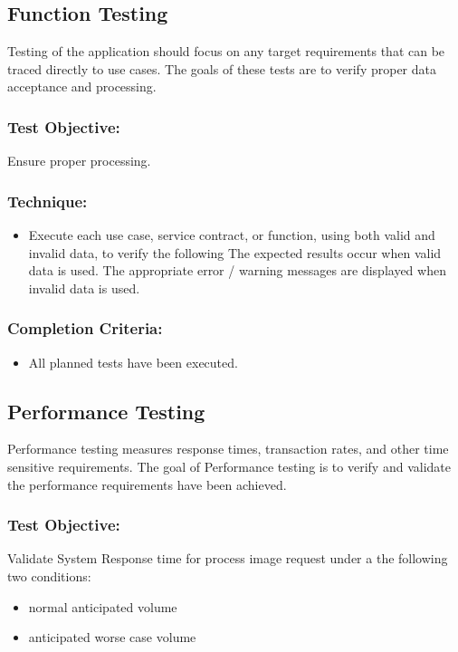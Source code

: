 \documentclass[a4paper,12pt]{report}
\begin{document}
		\subsection {Function Testing}
			Testing of the application should focus on any target requirements that can be traced directly to use cases. 
			The goals of these tests are to verify proper data acceptance and processing.
			\subsubsection {Test Objective:}
				Ensure proper processing.
			\subsubsection {Technique:}
				\begin {itemize}
					\item Execute each use case, service contract, or function, using both valid and invalid data, to verify the following
						\subitem The expected results occur when valid data is used.
						\subitem The appropriate error / warning messages are displayed when invalid data is used.
				\end {itemize}
			\subsubsection {Completion Criteria:}
				\begin {itemize}
					\item All planned tests have been executed.
				\end {itemize}
				
		\subsection {Performance Testing}
			Performance testing measures response times, transaction rates, and other time sensitive requirements. 
			The goal of Performance testing is to verify and validate the performance requirements have been achieved. 
			\subsubsection {Test Objective:}
					Validate System Response time for process image request under a the following two conditions:
					\begin {itemize}
						\item normal anticipated volume
						\item anticipated worse case volume
					\end {itemize}
\end{document}
